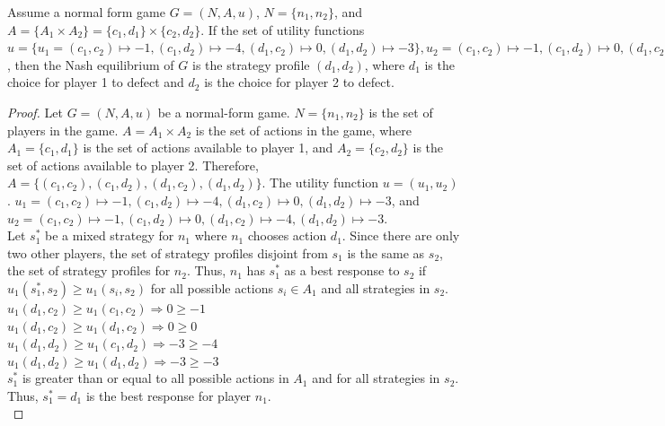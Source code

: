 \begin{thm}
  Assume a normal form game $G = (N, A, u)$, $N=\{n_1, n_2\}$, and $A=\{A_1\times A_2\} = \{c_1, d_1\}\times\{c_2, d_2\}$. If the set of utility functions $u = \{u_1=(c_1, c_2)\mapsto -1, (c_1, d_2)\mapsto -4, (d_1, c_2)\mapsto 0, (d_1, d_2)\mapsto -3\}, u_2=(c_1, c_2)\mapsto -1, (c_1, d_2)\mapsto 0, (d_1, c_2)\mapsto -4, (d_1, d_2)\mapsto -3$, then the Nash equilibrium of $G$ is the strategy profile $(d_1, d_2)$, where $d_1$ is the choice for player 1 to defect and $d_2$ is the choice for player 2 to defect.
\end{thm}
\begin{proof}
  Let $G=(N, A, u)$ be a normal-form game. $N = \{n_1, n_2\}$ is the set of players in the game. $A=A_1\times A_2$ is the set of actions in the game, where $A_1=\{c_1, d_1\}$ is the set of actions available to player 1, and $A_2=\{c_2, d_2\}$ is the set of actions available to player 2. Therefore, $A=\{(c_1, c_2), (c_1, d_2), (d_1, c_2), (d_1, d_2)\}$. The utility function $u=(u_1, u_2)$. $u_1=(c_1, c_2)\mapsto -1, (c_1, d_2)\mapsto -4, (d_1, c_2)\mapsto 0, (d_1, d_2)\mapsto -3$, and $u_2=(c_1, c_2)\mapsto -1, (c_1, d_2)\mapsto 0, (d_1, c_2)\mapsto -4, (d_1, d_2)\mapsto -3$.\\

  Let $s^*_1$ be a mixed strategy for $n_1$ where $n_1$ chooses action $d_1$. Since there are only two other players, the set of strategy profiles disjoint from $s_1$ is the same as $s_2$, the set of strategy profiles for $n_2$. Thus, $n_1$ has $s^*_1$ as a best response to $s_2$ if $u_1(s^*_1, s_2)\ge u_1(s_i, s_2)$ for all possible actions $s_i\in A_1$ and all strategies in $s_2$.\\
  
  $u_1(d_1, c_2)\ge u_1(c_1, c_2) \Rightarrow 0\ge -1$\\
  
  $u_1(d_1, c_2)\ge u_1(d_1, c_2) \Rightarrow 0\ge 0$\\

  $u_1(d_1, d_2)\ge u_1(c_1, d_2) \Rightarrow -3\ge -4$\\

  $u_1(d_1, d_2)\ge u_1(d_1, d_2) \Rightarrow -3\ge -3$\\

  $s^*_1$ is greater than or equal to all possible actions in $A_1$ and for all strategies in $s_2$. Thus, $s^*_1=d_1$ is the best response for player $n_1$.\\


\end{proof}
